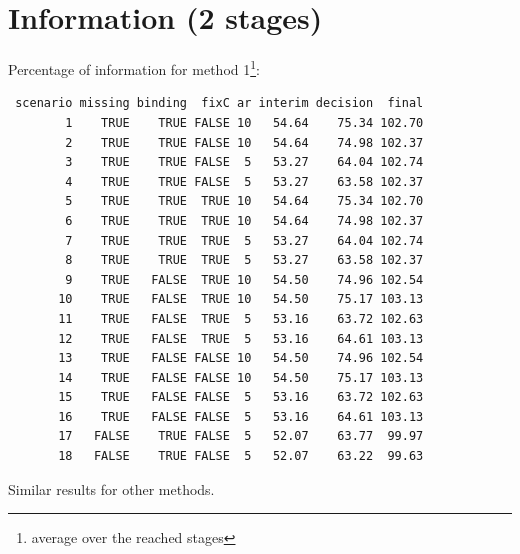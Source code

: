 \documentclass[12pt]{article}
\begin{document}
\clearpage

\section{Information (2 stages)}
\label{sec:org8906a77}

Percentage of information for method 1\footnote{average over the reached stages}:
\begin{verbatim}
 scenario missing binding  fixC ar interim decision  final
        1    TRUE    TRUE FALSE 10   54.64    75.34 102.70
        2    TRUE    TRUE FALSE 10   54.64    74.98 102.37
        3    TRUE    TRUE FALSE  5   53.27    64.04 102.74
        4    TRUE    TRUE FALSE  5   53.27    63.58 102.37
        5    TRUE    TRUE  TRUE 10   54.64    75.34 102.70
        6    TRUE    TRUE  TRUE 10   54.64    74.98 102.37
        7    TRUE    TRUE  TRUE  5   53.27    64.04 102.74
        8    TRUE    TRUE  TRUE  5   53.27    63.58 102.37
        9    TRUE   FALSE  TRUE 10   54.50    74.96 102.54
       10    TRUE   FALSE  TRUE 10   54.50    75.17 103.13
       11    TRUE   FALSE  TRUE  5   53.16    63.72 102.63
       12    TRUE   FALSE  TRUE  5   53.16    64.61 103.13
       13    TRUE   FALSE FALSE 10   54.50    74.96 102.54
       14    TRUE   FALSE FALSE 10   54.50    75.17 103.13
       15    TRUE   FALSE FALSE  5   53.16    63.72 102.63
       16    TRUE   FALSE FALSE  5   53.16    64.61 103.13
       17   FALSE    TRUE FALSE  5   52.07    63.77  99.97
       18   FALSE    TRUE FALSE  5   52.07    63.22  99.63
\end{verbatim}

Similar results for other methods.
\end{document}
